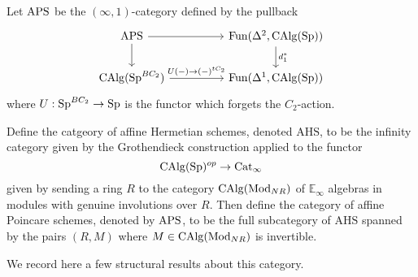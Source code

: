 \begin{definition}
Let $\mathrm{APS}$ be the $(\infty,1)$-category defined by the pullback \[
\begin{tikzcd}
\aps \arrow[rr]\arrow[d] & & \operatorname{Fun}(\Delta^2, \CAlg(\Spectra))\arrow[d,"d_1^*"]\\
\CAlg(\Spectra^{BC_2})\arrow[rr,"U(-)\to (-)^{tC_2}"] & & \operatorname{Fun}(\Delta^1, \CAlg(\Spectra))
\end{tikzcd}
\] where $U:\operatorname{Sp}^{BC_2}\to \operatorname{Sp}$ is the functor which forgets the $C_2$-action.
\end{definition}

\begin{definition}
Define the catgeory of affine Hermetian schemes, denoted $\mathrm{AHS}$, to be the infinity category given by the Grothendieck construction applied to the functor \[\operatorname{CAlg}(\operatorname{Sp})^{op}\to \mathrm{Cat}_\infty\] given by sending a ring $R$ to the category $\operatorname{CAlg}(\mathrm{Mod}_{NR})$ of $\mathbb{E}_\infty$ algebras in modules with genuine involutions over $R$. Then define the category of affine Poincare schemes, denoted by $\mathrm{APS}$, to be the full subcategory of $\mathrm{AHS}$ spanned by the pairs $(R, M)$ where $M\in \operatorname{CAlg}(\mathrm{Mod}_{NR})$ is invertible. 
\end{definition}

We record here a few structural results about this category.

